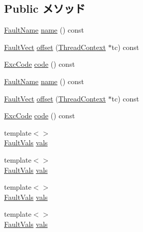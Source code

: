 \subsection*{Public メソッド}
\begin{DoxyCompactItemize}
\item 
\hyperlink{sim_2faults_8hh_abb196df64725e5c2568c900cf130d8d7}{FaultName} \hyperlink{classMipsISA_1_1MipsFault_a73adb23259baf912a81683a9790a303f}{name} () const 
\item 
\hyperlink{classm5_1_1params_1_1Addr}{FaultVect} \hyperlink{classMipsISA_1_1MipsFault_a9c059b781f653170e9da1d520c6d96b1}{offset} (\hyperlink{classThreadContext}{ThreadContext} $\ast$tc) const 
\item 
\hyperlink{namespaceMipsISA_abcc8a7c57cd8becefbfd621dbff5ffd4}{ExcCode} \hyperlink{classMipsISA_1_1MipsFault_a1dd20a2460d7723d3eaa287b7cc07e79}{code} () const 
\item 
\hyperlink{sim_2faults_8hh_abb196df64725e5c2568c900cf130d8d7}{FaultName} \hyperlink{classMipsISA_1_1MipsFault_a73adb23259baf912a81683a9790a303f}{name} () const 
\item 
\hyperlink{classm5_1_1params_1_1Addr}{FaultVect} \hyperlink{classMipsISA_1_1MipsFault_a9c059b781f653170e9da1d520c6d96b1}{offset} (\hyperlink{classThreadContext}{ThreadContext} $\ast$tc) const 
\item 
\hyperlink{namespaceMipsISA_abcc8a7c57cd8becefbfd621dbff5ffd4}{ExcCode} \hyperlink{classMipsISA_1_1MipsFault_a1dd20a2460d7723d3eaa287b7cc07e79}{code} () const 
\item 
{\footnotesize template$<$$>$ }\\\hyperlink{structMipsISA_1_1MipsFaultBase_1_1FaultVals}{FaultVals} \hyperlink{classMipsISA_1_1MipsFault_a8b3c2006cfd550d551232a82b397bbca}{vals}
\item 
{\footnotesize template$<$$>$ }\\\hyperlink{structMipsISA_1_1MipsFaultBase_1_1FaultVals}{FaultVals} \hyperlink{classMipsISA_1_1MipsFault_a8b3c2006cfd550d551232a82b397bbca}{vals}
\item 
{\footnotesize template$<$$>$ }\\\hyperlink{structMipsISA_1_1MipsFaultBase_1_1FaultVals}{FaultVals} \hyperlink{classMipsISA_1_1MipsFault_a8b3c2006cfd550d551232a82b397bbca}{vals}
\item 
{\footnotesize template$<$$>$ }\\\hyperlink{structMipsISA_1_1MipsFaultBase_1_1FaultVals}{FaultVals} \hyperlink{classMipsISA_1_1MipsFault_a8b3c2006cfd550d551232a82b397bbca}{vals}

\end{DoxyCompactItemize}
